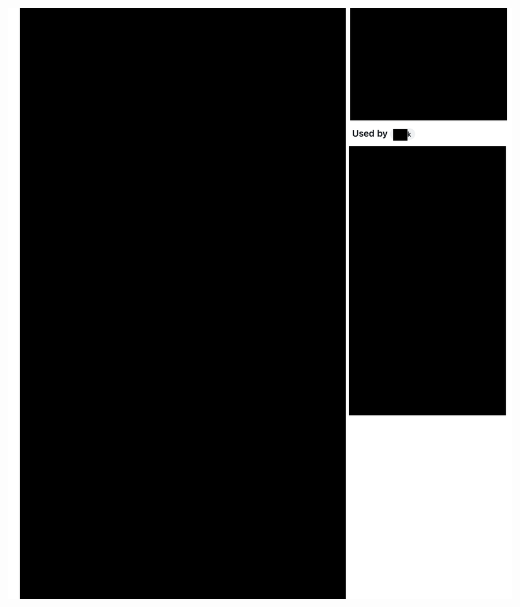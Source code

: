 \Continuing
\begin{center}
    \includegraphics[width=40em]{ieee-reference-one-project-one-github-p2_public}
\end{center}

\pagebreak
